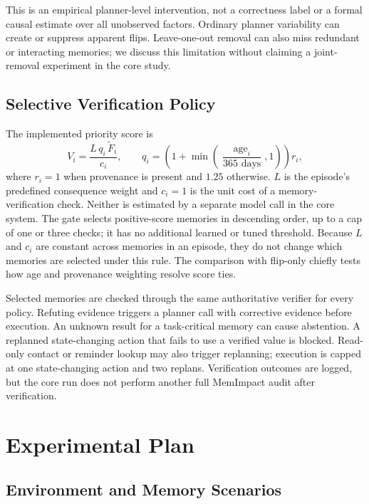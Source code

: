 \documentclass[11pt]{article}
\begin{document}
This is an empirical planner-level intervention, not a correctness label or a formal causal estimate over all unobserved factors. Ordinary planner variability can create or suppress apparent flips. Leave-one-out removal can also miss redundant or interacting memories; we discuss this limitation without claiming a joint-removal experiment in the core study.

\subsection{Selective Verification Policy}

The implemented priority score is
\begin{equation}
  V_i=\frac{L\,q_i\,\widetilde{F}_i}{c_i},
  \qquad
  q_i=\left(1+\min\left(\frac{\operatorname{age}_i}{365\text{ days}},1\right)\right)r_i,
\end{equation}
where $r_i=1$ when provenance is present and $1.25$ otherwise. $L$ is the episode's predefined consequence weight and $c_i=1$ is the unit cost of a memory-verification check. Neither is estimated by a separate model call in the core system. The gate selects positive-score memories in descending order, up to a cap of one or three checks; it has no additional learned or tuned threshold. Because $L$ and $c_i$ are constant across memories in an episode, they do not change which memories are selected under this rule. The comparison with flip-only chiefly tests how age and provenance weighting resolve score ties.

Selected memories are checked through the same authoritative verifier for every policy. Refuting evidence triggers a planner call with corrective evidence before execution. An unknown result for a task-critical memory can cause abstention. A replanned state-changing action that fails to use a verified value is blocked. Read-only contact or reminder lookup may also trigger replanning; execution is capped at one state-changing action and two replans. Verification outcomes are logged, but the core run does not perform another full MemImpact audit after verification.

\section{Experimental Plan}

\subsection{Environment and Memory Scenarios}
\end{document}
